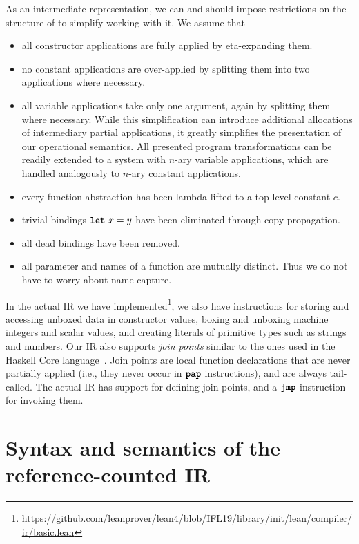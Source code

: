 \documentclass[sigconf]{acmart}
\begin{document}
As an intermediate representation, we can and should impose restrictions on the
structure of \pureIR{} to simplify working with it. We assume that

\begin{itemize}
\item all constructor applications are fully applied by eta-expanding them.
\item no constant applications are over-applied by splitting them into two applications where necessary.
\item all variable applications take only one argument, again by splitting them
  where necessary. While this simplification can introduce additional
  allocations of intermediary partial applications, it greatly simplifies the
  presentation of our operational semantics. All presented program
  transformations can be readily extended to a system with $n$-ary variable
  applications, which are handled analogously to $n$-ary constant applications.
\item every function abstraction has been lambda-lifted
  to a top-level constant $c$.
\item trivial bindings $\texttt{\textbf{let}}\ x = y$ have been eliminated through copy propagation.
\item all dead  bindings have been removed.
  \item all parameter and  names of a function are mutually distinct. Thus we
    do not have to worry about name capture.
\end{itemize}

In the actual IR we have implemented\footnote{\url{https://github.com/leanprover/lean4/blob/IFL19/library/init/lean/compiler/ir/basic.lean}}, we also have instructions for
storing and accessing unboxed data in constructor values, boxing
and unboxing machine integers and scalar values, and creating literals
of primitive types such as strings and numbers. Our IR also supports
\emph{join points} similar to the ones used in the Haskell Core
language~\cite{JoinPoints}. Join points are local
function declarations that are never partially applied (i.e., they never
occur in $\texttt{\textbf{pap}}$ instructions), and are always tail-called. The actual
IR has support for defining join points, and a $\texttt{\textbf{jmp}}$ instruction for
invoking them.

\section{Syntax and semantics of the reference-counted IR}
\label{sec:rc}
\end{document}

